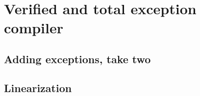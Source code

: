 \chapter{Verified and total exception compiler}
\label{chap:compiling2}

\section{Adding exceptions, take two}

\section{Linearization}
